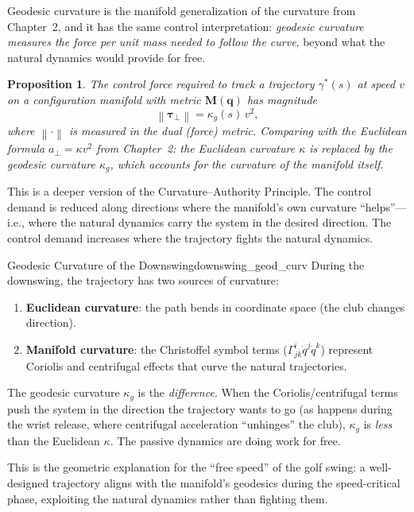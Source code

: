 \documentclass[12pt, openany]{book}
\theoremstyle{plain}
\newtheorem{proposition}{Proposition}[chapter]
\newcommand{\norm}[1]{\left\lVert #1 \right\rVert}
\begin{document}
Geodesic curvature is the manifold generalization of the curvature from
Chapter~2, and it has the same control interpretation: \emph{geodesic
curvature measures the force per unit mass needed to follow the curve},
beyond what the natural dynamics would provide for free.

\begin{proposition}
  The control force required to track a trajectory $\gamma^*(s)$ at speed
  $v$ on a configuration manifold with metric $\bm{M}(\bm{q})$ has magnitude
  \begin{equation}
    \norm{\bm{\tau}_{\perp}} = \kappa_g(s)\, v^2,
  \end{equation}
  where $\norm{\cdot}$ is measured in the dual (force) metric. Comparing with
  the Euclidean formula $a_\perp = \kappa v^2$ from Chapter~2: the Euclidean
  curvature $\kappa$ is replaced by the geodesic curvature $\kappa_g$, which
  accounts for the curvature of the manifold itself.
\end{proposition}

This is a deeper version of the Curvature--Authority Principle. The control
demand is reduced along directions where the manifold's own curvature
``helps''---i.e., where the natural dynamics carry the system in the desired
direction. The control demand increases where the trajectory fights the
natural dynamics.

\begin{example}{Geodesic Curvature of the Downswing}{downswing_geod_curv}
  During the downswing, the trajectory has two sources of curvature:
  \begin{enumerate}[label=(\alph*)]
    \item \textbf{Euclidean curvature}: the path bends in coordinate space
      (the club changes direction).
    \item \textbf{Manifold curvature}: the Christoffel symbol terms
      ($\Gamma^i_{jk}\dot{q}^j\dot{q}^k$) represent Coriolis and centrifugal
      effects that curve the natural trajectories.
  \end{enumerate}
  The geodesic curvature $\kappa_g$ is the \emph{difference}. When the
  Coriolis/centrifugal terms push the system in the direction the trajectory
  wants to go (as happens during the wrist release, where centrifugal
  acceleration ``unhinges'' the club), $\kappa_g$ is \emph{less} than the
  Euclidean $\kappa$. The passive dynamics are doing work for free.

  This is the geometric explanation for the ``free speed'' of the golf swing:
  a well-designed trajectory aligns with the manifold's geodesics during the
  speed-critical phase, exploiting the natural dynamics rather than fighting
  them.
\end{example}
\end{document}
